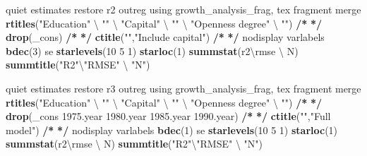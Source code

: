 \documentclass[
  12pt,
]{article}
\newenvironment{Shaded}{\begin{snugshade}}{\end{snugshade}}
\newcommand{\DecValTok}[1]{\textcolor[rgb]{0.00,0.00,0.81}{#1}}
\newcommand{\ErrorTok}[1]{\textcolor[rgb]{0.64,0.00,0.00}{\textbf{#1}}}
\newcommand{\FloatTok}[1]{\textcolor[rgb]{0.00,0.00,0.81}{#1}}
\newcommand{\KeywordTok}[1]{\textcolor[rgb]{0.13,0.29,0.53}{\textbf{#1}}}
\newcommand{\NormalTok}[1]{#1}
\newcommand{\OperatorTok}[1]{\textcolor[rgb]{0.81,0.36,0.00}{\textbf{#1}}}
\newcommand{\StringTok}[1]{\textcolor[rgb]{0.31,0.60,0.02}{#1}}
\begin{document}
\begin{Shaded}
\begin{Highlighting}[]
{\NormalTok{    quiet estimates restore r2}
\NormalTok{        outreg using growth_analysis_frag, tex fragment merge }\KeywordTok{rtitles}\NormalTok{(}\StringTok{"Education"}\NormalTok{ \textbackslash{} }\StringTok{""}\NormalTok{ \textbackslash{} }\StringTok{"Capital"}\NormalTok{ \textbackslash{} }\StringTok{""}\NormalTok{ \textbackslash{} }\StringTok{"Openness degree"}\NormalTok{ \textbackslash{} }\StringTok{""}\NormalTok{)  }\OperatorTok{/}\ErrorTok{*}
\StringTok{                }\ErrorTok{*/}\StringTok{ }\KeywordTok{drop}\NormalTok{(_cons) }\OperatorTok{/}\ErrorTok{*}
\StringTok{                }\ErrorTok{*/}\StringTok{ }\KeywordTok{ctitle}\NormalTok{(}\StringTok{""}\NormalTok{,}\StringTok{"Include capital"}\NormalTok{) }\OperatorTok{/}\ErrorTok{*}
\StringTok{                }\ErrorTok{*/}\StringTok{ }\NormalTok{nodisplay varlabels }\KeywordTok{bdec}\NormalTok{(}\DecValTok{3}\NormalTok{) se }\KeywordTok{starlevels}\NormalTok{(}\DecValTok{10} \DecValTok{5} \DecValTok{1}\NormalTok{) }\KeywordTok{starloc}\NormalTok{(}\DecValTok{1}\NormalTok{) }\KeywordTok{summstat}\NormalTok{(r2\textbackslash{}rmse \textbackslash{} N) }\KeywordTok{summtitle}\NormalTok{(}\StringTok{"R2"}\NormalTok{\textbackslash{}}\StringTok{"RMSE"}\NormalTok{ \textbackslash{} }\StringTok{"N"}\NormalTok{)}

\NormalTok{    quiet estimates restore r3}
\NormalTok{        outreg using growth_analysis_frag, tex fragment merge }\KeywordTok{rtitles}\NormalTok{(}\StringTok{"Education"}\NormalTok{ \textbackslash{} }\StringTok{""}\NormalTok{ \textbackslash{} }\StringTok{"Capital"}\NormalTok{ \textbackslash{} }\StringTok{""}\NormalTok{ \textbackslash{} }\StringTok{"Openness degree"}\NormalTok{ \textbackslash{} }\StringTok{""}\NormalTok{)  }\OperatorTok{/}\ErrorTok{*}
\StringTok{                }\ErrorTok{*/}\StringTok{ }\KeywordTok{drop}\NormalTok{(_cons }\FloatTok{1975.}\NormalTok{year }\FloatTok{1980.}\NormalTok{year }\FloatTok{1985.}\NormalTok{year }\FloatTok{1990.}\NormalTok{year) }\OperatorTok{/}\ErrorTok{*}
\StringTok{                }\ErrorTok{*/}\StringTok{ }\KeywordTok{ctitle}\NormalTok{(}\StringTok{""}\NormalTok{,}\StringTok{"Full model"}\NormalTok{) }\OperatorTok{/}\ErrorTok{*}
\StringTok{                }\ErrorTok{*/}\StringTok{ }\NormalTok{nodisplay varlabels }\KeywordTok{bdec}\NormalTok{(}\DecValTok{1}\NormalTok{) se }\KeywordTok{starlevels}\NormalTok{(}\DecValTok{10} \DecValTok{5} \DecValTok{1}\NormalTok{) }\KeywordTok{starloc}\NormalTok{(}\DecValTok{1}\NormalTok{) }\KeywordTok{summstat}\NormalTok{(r2\textbackslash{}rmse \textbackslash{} N) }\KeywordTok{summtitle}\NormalTok{(}\StringTok{"R2"}\NormalTok{\textbackslash{}}\StringTok{"RMSE"}\NormalTok{ \textbackslash{} }\StringTok{"N"}\NormalTok{)}

}
\end{Highlighting}
\end{Shaded}
\end{document}
